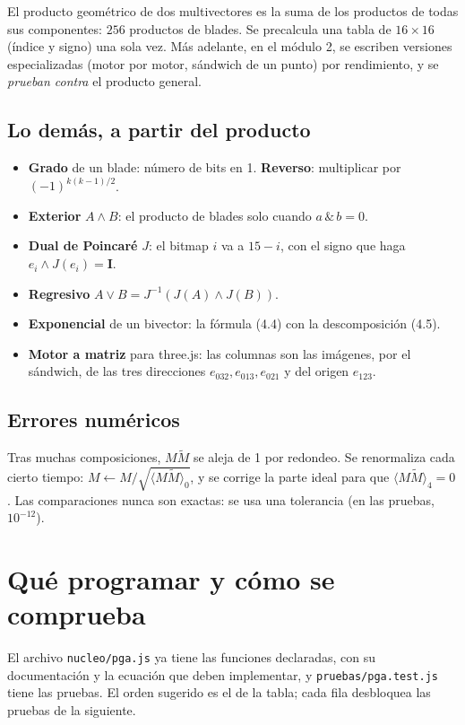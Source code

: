 \documentclass[11pt,a4paper]{article}
\numberwithin{equation}{section}
\newcommand{\rev}[1]{\widetilde{#1}}
\newcommand{\I}{\mathbf{I}}
\begin{document}
El producto geométrico de dos multivectores es la suma de los productos de todas sus componentes:
$256$ productos de blades. Se precalcula una tabla de $16\times16$ (índice y signo) una sola vez. Más adelante, en el
módulo 2, se escriben versiones especializadas (motor por motor, sándwich de un punto) por rendimiento, y se
\emph{prueban contra} el producto general.

\subsection{Lo demás, a partir del producto}
\begin{itemize}[leftmargin=*]
  \item \textbf{Grado} de un blade: número de bits en 1. \textbf{Reverso}: multiplicar por $(-1)^{k(k-1)/2}$.
  \item \textbf{Exterior} $A\wedge B$: el producto de blades solo cuando $a \,\&\, b = 0$.
  \item \textbf{Dual de Poincaré} $J$: el bitmap $i$ va a $15 - i$, con el signo que haga $e_i\wedge J(e_i) = \I$.
  \item \textbf{Regresivo} $A\vee B = J^{-1}(J(A)\wedge J(B))$.
  \item \textbf{Exponencial} de un bivector: la fórmula (4.4) con la descomposición (4.5).
  \item \textbf{Motor a matriz} para three.js: las columnas son las imágenes, por el sándwich, de las tres
        direcciones $e_{032}, e_{013}, e_{021}$ y del origen $e_{123}$.
\end{itemize}

\subsection{Errores numéricos}
Tras muchas composiciones, $M\rev M$ se aleja de 1 por redondeo. Se renormaliza cada cierto tiempo:
$M \leftarrow M/\sqrt{\langle M\rev M\rangle_0}$, y se corrige la parte ideal para que $\langle M\rev M\rangle_4 = 0$.
Las comparaciones nunca son exactas: se usa una tolerancia (en las pruebas, $10^{-12}$).

\section{Qué programar y cómo se comprueba}

El archivo \texttt{nucleo/pga.js} ya tiene las funciones declaradas, con su documentación y la ecuación que deben
implementar, y \texttt{pruebas/pga.test.js} tiene las pruebas. El orden sugerido es el de la tabla; cada fila
desbloquea las pruebas de la siguiente.
\end{document}
